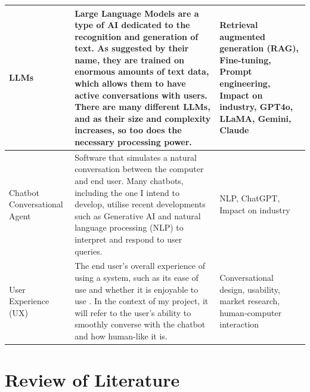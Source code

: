 \documentclass[12pt]{report}
\begin{document}
\begin{table}[H]
\begin{tabular}{|p{}|p{} | p{}|}
            \\

            \hline
            
            LLMs & Large Language Models are a type of AI dedicated to the recognition and generation of text.
            As suggested by their name, they are trained on enormous amounts of text data, which allows them 
            to have active conversations with users. There are many different LLMs, and as their size and 
            complexity increases, so too does the necessary processing power. &
            Retrieval augmented generation (RAG), Fine-tuning, Prompt engineering, Impact on industry,
            GPT4o, LLaMA, Gemini, Claude
            
            \\

            \hline
            Chatbot \newline Conversational Agent & Software that simulates a natural conversation between the 
            computer and end user. Many chatbots, including the one I intend to develop, utilise recent
            developments such as Generative AI and natural language processing (NLP) to interpret and respond to user queries.
            \autocite{IBMChatbotDef}
            & NLP, ChatGPT, Impact on industry \\

            \hline 

            User Experience (UX) & The end user's overall experience of using a system, such as its ease of use and 
            whether it is enjoyable to use \autocite{UXDict}. In the context of my project, it will refer to the user's 
            ability to smoothly converse with the chatbot and how human-like it is. 
            & Conversational design, usability, market research, human-computer interaction

            \\

            \hline 

        \end{tabular}\label{tab:themes}
    \end{table}


    \pagebreak %

    \section{Review of Literature}
\end{document}
